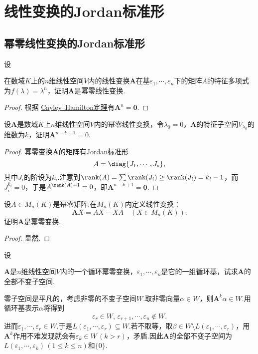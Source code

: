 \section{线性变换的Jordan标准形}
\subsection{幂零线性变换的Jordan标准形}
\begin{prob}[1]
	\hypertarget{CharacteristicPolynomialOfNilpotent}{设}在数域$K$上的$n$维线性空间$V$内的线性变换$\bm A$在基$\varepsilon_1,\cdots,\varepsilon_n$下的矩阵$A$的特征多项式为$f(\lambda)=\lambda^n$，证明$\bm A$是幂零线性变换.
\end{prob}
\begin{proof}
	根据 \hyperlink{Hamilton-Cayley}{Cayley--Hamilton定理}有$\bm A^n=\bm 0$.
\end{proof}
\begin{prob}[2]
	设$\bm A$是数域$K$上$n$维线性空间$V$内的幂零线性变换，令$\lambda_0=0$，$\bm A$的特征子空间$V_{\lambda_0}$的维数为$k$，证明$\bm A^{n-k+1}=0$.
\end{prob}
\begin{proof}
	幂零变换$\bm A$的矩阵有Jordan标准形
	\[
		A=\diag{J_1,\cdots,J_s},
	\]
	其中$J_i$的阶设为$k_i$.注意到$\rank(A)=\sum\rank(J_i)\ge\rank(J_i)=k_i-1$，而$J_i^{k_i}=0$，于是$A^{\rank(A)+1}=0$，即$\bm A^{n-k+1}=\bm 0$.
\end{proof}
\begin{prob}[4]
	设$A\in M_n(K)$是幂零矩阵.在$M_n(K)$内定义线性变换：
	\[
		\bm AX=AX-XA\quad(X\in M_n(K)).
	\]
	证明$\bm A$是幂零变换.
\end{prob}
\begin{proof}
	显然.
\end{proof}
\begin{prob}[6]
	\hypertarget{InvariantSubspaceOfNipotent}{设}$\bm A$是$n$维线性空间$V$内的一个循环幂零变换，$\varepsilon_1,\cdots,\varepsilon_n$是它的一组循环基，试求$\bm A$的全部不变子空间.
\end{prob}
\begin{sol}
	零子空间是平凡的，考虑非零的不变子空间$W$.取非零向量$\alpha\in W$，则$\bm A^k\alpha\in W$.用循环基表示$\alpha$将得到
	\[
		\varepsilon_r\in W,\,\varepsilon_{r+1},\cdots,\varepsilon_n\notin W.
	\]
	进而$\varepsilon_1,\cdots,\varepsilon_r\in W$.于是$L(\varepsilon_1,\cdots,\varepsilon_r)\subseteq W$.若不取等，取$\beta\in W\setminus L(\varepsilon_1,\cdots,\varepsilon_r)$，用$\bm A^k$作用不难发现就会有$\varepsilon_k\in W\,(k>r)$，矛盾.因此$\bm A$的全部不变子空间为$L(\varepsilon_1,\cdots,\varepsilon_k)\,(1\le k\le n)$和$\{0\}$.
\end{sol}
